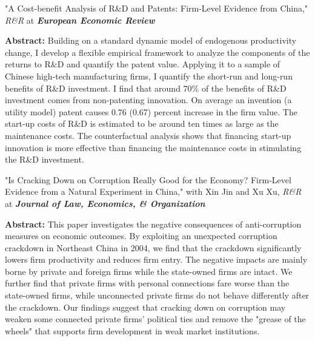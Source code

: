 \documentclass[letterpaper]{article}
\begin{document}
"A Cost-benefit Analysis of R\&D and Patents: Firm-Level Evidence from China," \textit{R\&R} at \textbf{\textit {European Economic Review}}
 \vspace{0.05in}
 \begin{center}
 \begin{minipage}{0.9\linewidth}
   \textbf{Abstract:} Building on a standard dynamic model of endogenous productivity change, I develop a flexible empirical framework to analyze the components of the returns to R\&D and quantify the patent value. Applying it to a sample of Chinese high-tech manufacturing firms, I quantify the short-run
and long-run benefits of R\&D investment. I find that around 70\% of the benefits of R\&D investment comes from non-patenting innovation. On average an invention (a utility model) patent causes 0.76 (0.67) percent increase in the firm value. The start-up costs of R\&D is estimated to be around ten times as large as the maintenance costs. The counterfactual analysis shows that financing start-up innovation is more effective than financing the maintenance costs in stimulating the R\&D investment.
 \end{minipage}
 \end{center}
 \vspace{0.05in}
 "Is Cracking Down on Corruption Really Good for the Economy? Firm-Level Evidence from a Natural Experiment in China," with Xin Jin and Xu Xu, \textit{R\&R} at \textbf{\textit{Journal of Law, Economics, \& Organization}}
  \vspace{0.05in}
 \begin{center}
 \begin{minipage}{0.9\linewidth}
   \textbf{Abstract:} This paper investigates the negative consequences of anti-corruption measures on economic outcomes. By exploiting an unexpected corruption crackdown in Northeast China in 2004, we find that the crackdown significantly lowers firm productivity and reduces firm entry. The negative impacts are mainly borne by private and foreign firms while the state-owned firms are intact. We further find that private firms with personal connections fare worse than the state-owned firms, while unconnected private firms do not behave differently after the crackdown. Our findings suggest that cracking down on corruption may weaken some connected private firms' political ties and remove the "grease of the wheels" that supports firm development in weak market institutions.
 \end{minipage}
 \end{center}
\end{document}
